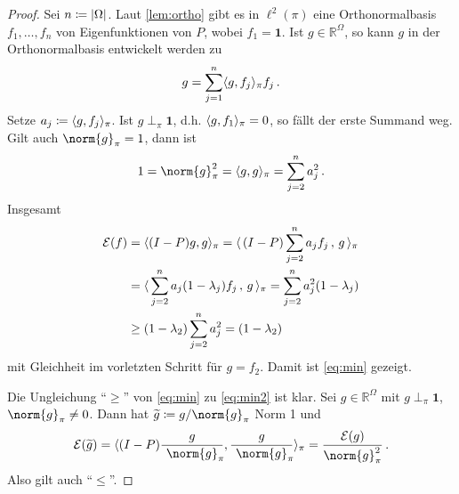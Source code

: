 \documentclass[ngerman,a4paper,11pt]{scrartcl}
\newcommand{\fracnorm}[3]{%
    \ensuremath{\frac{\! #1\!}{\! {}_{\phantom{#3}}\norm{#2}_{#3}\!}}%
}
\newcommand{\diri}{\mathcal{E}}
\newcommand{\RR}{\mathbb{R}}
\DeclarePairedDelimiter{\sprod}{\langle}{\rangle}	%
\DeclarePairedDelimiter{\abs}{\lvert}{\rvert}		%
\begin{document}


\begin{proof} %
 Sei $n\coloneqq\abs{\Omega}$. Laut \cref{lem:ortho} gibt es in $\ell^2(\pi)$ eine
 Orthonormalbasis $f_1,\dotsc,f_n$ von Eigenfunktionen von $P$, wobei $f_1=\mathbf{1}$. Ist
 $g\in\RR^\Omega$, so kann $g$ in der Orthonormalbasis entwickelt werden zu
 \begin{equation*}
  g=\sum_{j=1}^n\sprod{g,f_j}_\pi f_j\, . 
 \end{equation*}
 Setze $a_j\coloneqq\sprod{g,f_j}_\pi$.
 Ist $g\perp_\pi\mathbf{1}$, d.h. $\sprod{g,f_1}_\pi=0$, so fällt der erste
 Summand weg. Gilt auch $\norm{g}_\pi=1$, dann ist
 \begin{equation*}
  1=\norm{g}_\pi^2=\sprod{g,g}_\pi=\sum_{j=2}^na_j^2\, .
 \end{equation*}
 Insgesamt
 \begin{align*}
  \diri(f)&=\sprod{(I-P)g,g}_\pi=\sprod{\, (I-P)\sum_{j=2}^n a_j f_j\, ,\, g\,}_\pi \\
          &=\sprod{\, \sum_{j=2}^n a_j (1-\lambda_j)f_j\, ,\, g\, }_\pi=\sum_{j=2}^na_j^2 (1-\lambda_j) \\
          &\geq(1-\lambda_2)\sum_{j=2}^n a_j^2=(1-\lambda_2)
 \end{align*}
 mit Gleichheit im vorletzten Schritt für $g=f_2$. Damit ist \cref{eq:min} gezeigt.
 
 Die Ungleichung \enquote{$\geq$} von \eqref{eq:min} zu \eqref{eq:min2} ist klar. Sei
 $g\in\RR^\Omega$ mit $g\perp_\pi\mathbf{1}$, $\norm{g}_\pi\neq0$. Dann hat
 $\widetilde{g}\coloneqq g/\norm{g}_\pi$ Norm 1 und 
 \begin{equation*}
  \diri(\widetilde{g})=\sprod{(I-P)\fracnorm{g}{g}{\pi},\fracnorm{g}{g}{\pi}}_\pi=\frac{\diri(g)}{\norm{g}_\pi^2}\, .
 \end{equation*}
 Also gilt auch \enquote{$\leq$}.
\end{proof}
\end{document}
